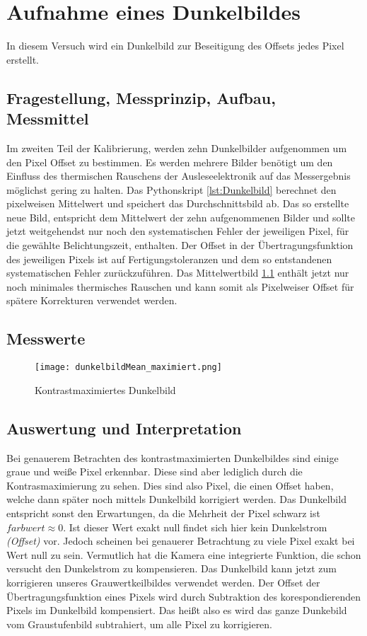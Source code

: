 %
%
\chapter{Aufnahme eines Dunkelbildes}
In diesem Versuch wird ein Dunkelbild zur Beseitigung des Offsets jedes Pixel erstellt.
\label{chap:Aufnahme_eines_Dunkelbildes}

\section{Fragestellung, Messprinzip, Aufbau, Messmittel}
Im zweiten Teil der Kalibrierung, werden zehn Dunkelbilder aufgenommen um den Pixel Offset zu bestimmen. Es werden mehrere Bilder benötigt um den Einfluss des thermischen Rauschens der Ausleseelektronik auf das Messergebnis möglichst gering zu halten. Das Pythonskript \ref{lst:Dunkelbild} berechnet den pixelweisen Mittelwert und speichert das Durchschnittsbild ab. Das so erstellte neue Bild, entspricht dem Mittelwert der zehn aufgenommenen Bilder und sollte jetzt weitgehendst nur noch den systematischen Fehler der jeweiligen Pixel, für die gewählte Belichtungszeit, enthalten. Der Offset in der Übertragungsfunktion des jeweiligen Pixels ist auf Fertigungstoleranzen und dem so entstandenen systematischen Fehler zurückzuführen. Das Mittelwertbild \ref{img:dunkelbild_kontrastmax} enthält jetzt nur noch minimales thermisches Rauschen und kann somit als Pixelweiser Offset für spätere Korrekturen verwendet werden.
\label{chap:VERSUCH_2_FRAGESTELLUNG}

\section{Messwerte}
\begin{figure}[H]
\centering
\texttt{[image: dunkelbildMean\_maximiert.png]}
\caption{Kontrastmaximiertes Dunkelbild}
\label{img:dunkelbild_kontrastmax}
\end{figure}
\label{chap:VERSUCH_2_MESSWERTE}

\section{Auswertung und Interpretation}
\label{chap:VERSUCH_2_AUSWERTUNG}
Bei genauerem Betrachten des kontrastmaximierten Dunkelbildes sind einige graue und weiße Pixel erkennbar. Diese sind aber lediglich durch die Kontrasmaximierung zu sehen. Dies sind also Pixel, die einen Offset haben, welche dann später noch mittels Dunkelbild korrigiert werden.
Das Dunkelbild entspricht sonst den Erwartungen, da die Mehrheit der Pixel schwarz ist $farbwert \approx 0$. Ist dieser Wert exakt null findet sich hier kein Dunkelstrom \textit{(Offset)} vor. Jedoch scheinen bei genauerer Betrachtung zu viele Pixel exakt bei Wert null zu sein. Vermutlich hat die Kamera eine integrierte Funktion, die schon versucht den Dunkelstrom zu kompensieren.
Das Dunkelbild kann jetzt zum korrigieren unseres Grauwertkeilbildes verwendet werden. Der Offset der Übertragungsfunktion eines Pixels wird durch Subtraktion des korespondierenden Pixels im Dunkelbild kompensiert. Das heißt also es wird das ganze Dunkebild vom Graustufenbild subtrahiert, um alle Pixel zu korrigieren.
